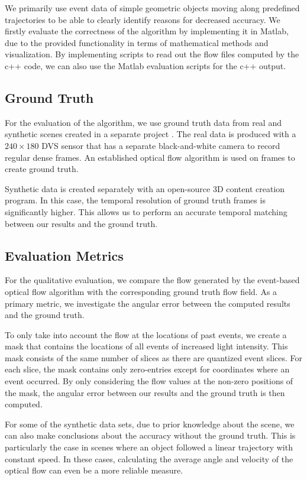 We primarily use event data of simple geometric objects moving along predefined trajectories to be able to clearly identify reasons for decreased accuracy.
We firstly evaluate the correctness of the algorithm by implementing it in Matlab, due to the provided functionality in terms of mathematical methods and visualization.
By implementing scripts to read out the flow files computed by the c++ code, we can also use the Matlab evaluation scripts for the c++ output.
\subsection{Ground Truth}
For the evaluation of the algorithm, we use ground truth data from real and synthetic scenes created in a separate project \cite{Scherer2015}.
The real data is produced with a $240\times180$ DVS sensor that has a separate black-and-white camera to record regular dense frames.
An established optical flow algorithm is used on frames to create ground truth.


Synthetic data is created separately with an open-source 3D content creation program. 
In this case, the temporal resolution of ground truth frames is significantly higher. %
This allows us to perform an accurate temporal matching between our results and the ground truth.

\subsection{Evaluation Metrics}
For the qualitative evaluation, we compare the flow generated by the event-based optical flow algorithm with the corresponding ground truth flow field. As a primary metric, we investigate the angular error between the computed results and the ground truth. 

To only take into account the flow at the locations of past events, we create a mask that contains the locations of all events of increased light intensity.
This mask consists of the same number of slices as there are quantized event slices.
For each slice, the mask contains only zero-entries except for coordinates where an event occurred. 
By only considering the flow values at the non-zero positions of the mask, 
the angular error between our results and the ground truth is then computed.


For some of the synthetic data sets, due to prior knowledge about the scene, we can also make conclusions about the accuracy without the ground truth.
This is particularly the case in scenes where an object followed a linear trajectory with constant speed.
In these cases, calculating the average angle and velocity of the optical flow can even be a more reliable measure. 


